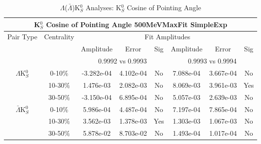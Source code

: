 \documentclass[../AnalysisNoteJBuxton.tex]{subfiles}
\begin{document}
\begin{table}
 \centering
 \begin{tabular}{|c|c|c|c|c||c|c|c|}
  \multicolumn{8}{c}{K$^{0}_{S}$ Cosine of Pointing Angle 500MeVMaxFit SimpleExp} \\
  \hline
  \multirow{3}{*}{Pair Type} & \multirow{3}{*}{Centrality} & \multicolumn{6}{c|}{Fit Amplitudes} \\
  \cline{3-8}
   & & Amplitude & Error & Sig & Amplitude & Error & Sig \\  
  \cline{3-8}
   & & \multicolumn{3}{c||}{0.9992 vs 0.9993} & \multicolumn{3}{c|}{0.9993 vs 0.9994} \\  
  \hline  
  \multirow{3}{*}{$\Lambda$K$^{0}_{S}$}  
   &  0-10\% & -3.282e-04 & 4.102e-04 & No & 7.088e-04 & 3.667e-04 & No \\
   & 10-30\% & 1.476e-03 & 2.082e-03 & No & 8.069e-03 & 3.961e-03 & Yes \\
   & 30-50\% & -3.150e-04 & 6.895e-04 & No & 5.057e-03 & 2.639e-03 & No \\
  \hline  
  \multirow{3}{*}{$\bar{\Lambda}$K$^{0}_{S}$}  
   &  0-10\% & 5.986e-04 & 4.487e-04 & No & 7.197e-04 & 7.865e-04 & No \\
   & 10-30\% & 3.562e-03 & 1.378e-03 & Yes & 1.303e-03 & 1.067e-03 & No \\
   & 30-50\% & 5.878e-02 & 8.703e-02 & No & 1.493e-04 & 1.017e-04 & No \\
  \hline
 \end{tabular}
 \caption{$\Lambda$($\bar{\Lambda}$)K$^{0}_{S}$ Analyses: K$^{0}_{S}$ Cosine of Pointing Angle}
 \label{tab:K0CosPointingAngleLamK0_500MeVMaxFit_SimpleExp}
\end{table}





\end{document}
